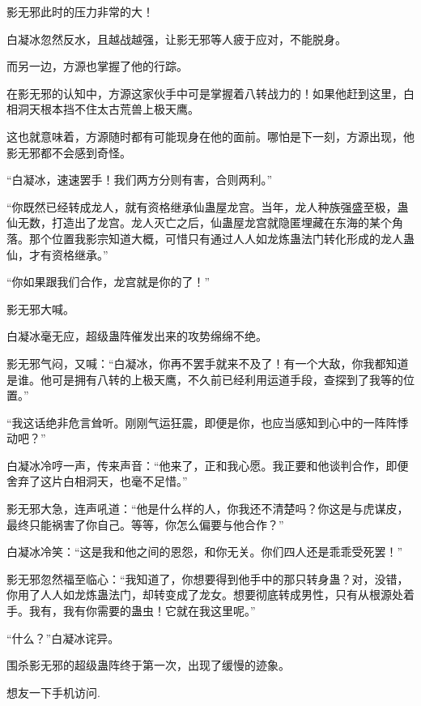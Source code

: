 \begin{this_body}
影无邪此时的压力非常的大！

白凝冰忽然反水，且越战越强，让影无邪等人疲于应对，不能脱身。

而另一边，方源也掌握了他的行踪。

在影无邪的认知中，方源这家伙手中可是掌握着八转战力的！如果他赶到这里，白相洞天根本挡不住太古荒兽上极天鹰。

这也就意味着，方源随时都有可能现身在他的面前。哪怕是下一刻，方源出现，他影无邪都不会感到奇怪。

“白凝冰，速速罢手！我们两方分则有害，合则两利。”

“你既然已经转成龙人，就有资格继承仙蛊屋龙宫。当年，龙人种族强盛至极，蛊仙无数，打造出了龙宫。龙人灭亡之后，仙蛊屋龙宫就隐匿埋藏在东海的某个角落。那个位置我影宗知道大概，可惜只有通过人人如龙炼蛊法门转化形成的龙人蛊仙，才有资格继承。”

“你如果跟我们合作，龙宫就是你的了！”

影无邪大喊。

白凝冰毫无应，超级蛊阵催发出来的攻势绵绵不绝。

影无邪气闷，又喊：“白凝冰，你再不罢手就来不及了！有一个大敌，你我都知道是谁。他可是拥有八转的上极天鹰，不久前已经利用运道手段，查探到了我等的位置。”

“我这话绝非危言耸听。刚刚气运狂震，即便是你，也应当感知到心中的一阵阵悸动吧？”

白凝冰冷哼一声，传来声音：“他来了，正和我心愿。我正要和他谈判合作，即便舍弃了这片白相洞天，也毫不足惜。”

影无邪大急，连声吼道：“他是什么样的人，你我还不清楚吗？你这是与虎谋皮，最终只能祸害了你自己。等等，你怎么偏要与他合作？”

白凝冰冷笑：“这是我和他之间的恩怨，和你无关。你们四人还是乖乖受死罢！”

影无邪忽然福至临心：“我知道了，你想要得到他手中的那只转身蛊？对，没错，你用了人人如龙炼蛊法门，却转变成了龙女。想要彻底转成男性，只有从根源处着手。我有，我有你需要的蛊虫！它就在我这里呢。”

“什么？”白凝冰诧异。

围杀影无邪的超级蛊阵终于第一次，出现了缓慢的迹象。

想友一下手机访问.

\end{this_body}

